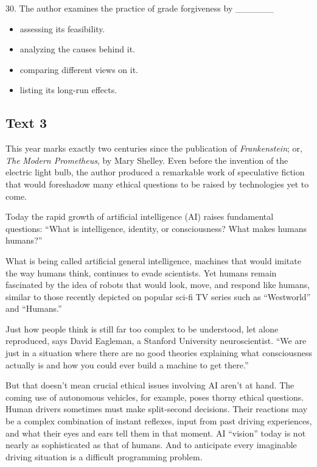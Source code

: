 \documentclass[UTF8,11pt]{ctexart}
\begin{document}
30. The author examines the practice of grade forgiveness by \_\_\_\_\_\_


\begin{itemize}[leftmargin=2em,itemsep=.2em,topsep=.4em]\item[A.] assessing its feasibility.
\item[B.] analyzing the causes behind it.
\item[C.] comparing different views on it.
\item[D.] listing its long-run effects.
\end{itemize}

\subsection*{\textbf{Text 3}}


This year marks exactly two centuries since the publication of \textit{Frankenstein}; or, \textit{The} \textit{Modern Prometheus}, by Mary Shelley. Even before the invention of the electric light bulb, the author produced a remarkable work of speculative fiction that would foreshadow many ethical questions to be raised by technologies yet to come.


Today the rapid growth of artificial intelligence (AI) raises fundamental questions: “What is intelligence, identity, or consciousness? What makes humans humans?”


What is being called artificial general intelligence, machines that would imitate the way humans think, continues to evade scientists. Yet humans remain fascinated by the idea of robots that would look, move, and respond like humans, similar to those recently depicted on popular sci-fi TV series such as “Westworld” and “Humans.”


Just how people think is still far too complex to be understood, let alone reproduced, says David Eagleman, a Stanford University neuroscientist. “We are just in a situation where there are no good theories explaining what consciousness actually is and how you could ever build a machine to get there.”


But that doesn’t mean crucial ethical issues involving AI aren’t at hand. The coming use of autonomous vehicles, for example, poses thorny ethical questions. Human drivers sometimes must make split-second decisions. Their reactions may be a complex combination of instant reflexes, input from past driving experiences, and what their eyes and ears tell them in that moment. AI “vision” today is not nearly as sophisticated as that of humans. And to anticipate every imaginable driving situation is a difficult programming problem.
\end{document}
